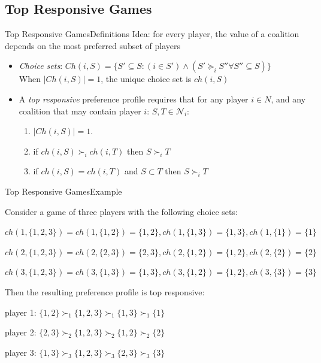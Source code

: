 \documentclass[xcolor=dvipsnames]{beamer}
\newcommand{\Ch}{\mathit{Ch}}
\newcommand{\ch}{\mathit{ch}}
\begin{document}
\subsection{Top Responsive Games}
\begin{frame}{Top Responsive Games}{Definitions}
  Idea: for every player, the value of a coalition depends on the most preferred subset of players
  \begin{itemize}
    \item \textit{Choice sets}:
      $\Ch(i, S) = \{S' \subseteq S: (i \in S') \wedge (S' \succeq_i S'' \forall S'' \subseteq S)\}$\\
      When $|\Ch(i, S)| = 1$, the unique choice set is $\ch(i, S)$
    \item A \textit{top responsive} preference profile requires that for any player $i \in N$,
    and any coalition that may contain player $i$: $S, T \in \mathcal{N}_i$:
    \begin{enumerate}
      \item $|\Ch(i, S)| = 1$.
      \item if $\ch(i, S) \succ_i \ch(i, T)$ then $S \succ_i T$
      \item if $\ch(i, S) = \ch(i, T)$ and $S \subset T$ then $S \succ_i T$
    \end{enumerate}
  \end{itemize}
\end{frame}

\begin{frame}{Top Responsive Games}{Example}
  \begin{example}
    \label{example:top_responsive_pref}
    \small
    Consider a game of three players with the following choice sets:

    $\ch(1, \{1, 2, 3\}) = \ch(1, \{1, 2\}) = \{1, 2\},
     \ch(1, \{1, 3\}) = \{1, 3\}, \ch(1, \{1\}) = \{1\}$

    $\ch(2, \{1, 2, 3\}) = \ch(2, \{2, 3\}) = \{2, 3\},
     \ch(2, \{1, 2\}) = \{1, 2\}, \ch(2, \{2\}) = \{2\}$

    $\ch(3, \{1, 2, 3\}) = \ch(3, \{1, 3\}) = \{1, 3\},
     \ch(3, \{1, 2\}) = \{1, 2\}, \ch(3, \{3\}) = \{3\}$
  \end{example}

  Then the resulting preference profile is top responsive:

  player 1: $\{1, 2\} \succ_1 \{1, 2, 3\} \succ_1 \{1, 3\} \succ_1  \{1\}$

  player 2: $\{2, 3\} \succ_2 \{1, 2, 3\} \succ_2 \{1, 2\} \succ_2  \{2\}$

  player 3: $\{1, 3\} \succ_3 \{1, 2, 3\} \succ_3 \{2, 3\} \succ_3  \{3\}$
\end{frame}
\end{document}
